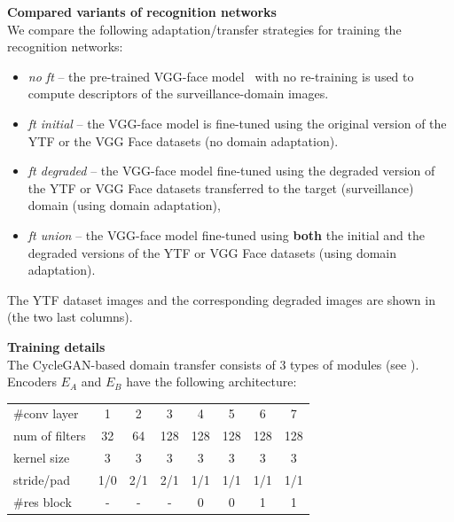 \bigskip\indent\textbf{Compared variants of recognition networks}\\
\label{sect:ft}
We compare the following adaptation/transfer strategies for training the recognition networks:
\begin{itemize}

\item \textit{no ft} -- the pre-trained VGG-face model~\citep{parkhi2015deep} with no re-training is used to compute descriptors of the surveillance-domain images.


\item \textit{ft initial} -- the VGG-face model is fine-tuned using the original version of the YTF or the VGG Face datasets (no domain adaptation). 

\item \textit{ft degraded} -- the VGG-face model fine-tuned using the degraded version of the YTF or VGG Face datasets transferred to the target (surveillance) domain (using domain adaptation),

\item \textit{ft union} -- the VGG-face model fine-tuned using \textbf{both} the initial and the degraded versions  of the YTF or VGG Face datasets (using domain adaptation). 

\end{itemize}

The YTF dataset images and the corresponding degraded images are shown  in  (the two last columns).



 
\bigskip\indent\textbf{Training details}\\
\label{sect:training}
The CycleGAN-based domain transfer consists of $3$ types of modules (see ).
Encoders $E_A$ and $E_B$ have the following architecture:
\begin{center}
\begin{scriptsize}
\begin{tabular}{l | c c c c c c c}
\hline
  \#conv layer      &1   &2      &3    &4     &5    &6    &7     \\
  num of filters    &32  &64     &128  &128   &128  &128  & 128  \\
  kernel size       &3   &3      &3    &3     & 3   &3    &3     \\
  stride/pad        &1/0 &2/1    &2/1  &1/1   &1/1  &1/1  & 1/1  \\
  \#res block       & -  & -     & -   & 0    &0    &1    &1     \\
\hline
\end{tabular}
\end{scriptsize}
\end{center}
\vspace{0.5em}

